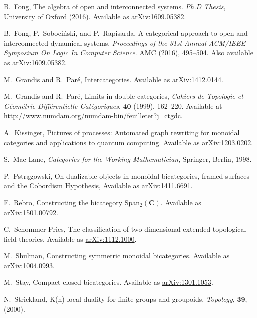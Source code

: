 \documentclass[11pt]{amsart}
\newcommand{\cat}[1]{\mathbf{#1}}
\theoremstyle{remark}
\theoremstyle{definition}
\begin{document}
\begin{thebibliography}{100}
B.~Fong,
The algebra of open and interconnected systems.
\emph{Ph.D Thesis},
University of Oxford (2016).
Available as \href{https://arxiv.org/abs/1609.05382}{arXiv:1609.05382}.

B.~Fong, P.~Soboci\'{n}ski, and P.~Rapisarda,
A categorical approach to open and interconnected dynamical systems.
\emph{Proceedings of the 31st Annual ACM/IEEE Symposium On Logic In Computer Science}.
AMC (2016), 495--504.
Also available as \href{https://arxiv.org/abs/1609.05382}{arXiv:1609.05382}.

M.~Grandis and R.~Par\'{e}, 
Intercategories.
Available as \href{https://arxiv.org/abs/1412.0144}{arXiv:1412.0144}.

M.~Grandis and R.~Par\'{e}, 
Limits in double categories, 
\emph{Cahiers de Topologie et G\'{e}om\'{e}trie Diff\'{e}rentielle Cat\'{e}goriques}, $\mathbf{40}$  
(1999), 162--220. 
Available at \href{http://www.numdam.org/numdam-bin/feuilleter?j=ctgdc}{http://www.numdam.org/numdam-bin/feuilleter?j=ctgdc}.

A.~Kissinger,
Pictures of processes: Automated 
graph rewriting for monoidal categories 
and applications to quantum computing.
Available as \href{https://arxiv.org/abs/1203.0202}{arXiv:1203.0202}.

S.~Mac Lane, 
\emph{Categories for the Working Mathematician},
Springer, Berlin, 1998.

P.~Pstrągowski,
On dualizable objects in monoidal bicategories, framed surfaces and the Cobordism Hypothesis, 
Available as \href{https://arxiv.org/abs/1411.6691}{arXiv:1411.6691}.

F.~Rebro, 
Constructing the bicategory Span$_{2}(\cat{C})$. 
Available as \href{https://arxiv.org/abs/1501.00792}{arXiv:1501.00792}.

C.~Schommer-Pries,
The classification of two-dimensional extended topological field theories. 
Available as \href{https://arxiv.org/abs/1112.1000}{arXiv:1112.1000}.

M.~Shulman, 
Constructing symmetric monoidal bicategories. 
Available as \href{http://arxiv.org/abs/1004.0993}{arXiv:1004.0993}.

 M.~Stay, 
Compact closed bicategories. 
Available as \href{http://arxiv.org/abs/1301.1053}{arXiv:1301.1053}.

N.\ Strickland,
K(n)-local duality for finite groups and groupoids,
\emph{Topology}, $\mathbf{39}$, (2000).

\end{thebibliography}


%
%
\end{document}
